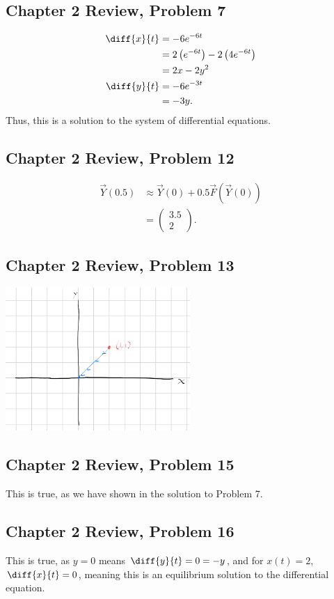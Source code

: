 \documentclass[10pt]{mypackage}
\begin{document}
\subsection{Chapter 2 Review, Problem 7}%
\begin{align*}
  \diff{x}{t} &= -6e^{-6t}\\
              &= 2\left(e^{-6t}\right) - 2\left(4e^{-6t}\right)\\
              &= 2x - 2y^2\\
  \diff{y}{t} &= -6e^{-3t}\\
              &= -3y.
\end{align*}
Thus, this is a solution to the system of differential equations.
\subsection{Chapter 2 Review, Problem 12}%
\begin{align*}
  \vec{Y}\left(0.5\right) &\approx \vec{Y}(0) + 0.5\vec{F}\left(\vec{Y}(0)\right)\\
                          &= \begin{pmatrix}3.5\\2\end{pmatrix}.
\end{align*}
\subsection{Chapter 2 Review, Problem 13}%
\begin{center}
  \includegraphics[width=7cm]{images/2_review_13.png}
\end{center}
\subsection{Chapter 2 Review, Problem 15}%
This is true, as we have shown in the solution to Problem 7.
\subsection{Chapter 2 Review, Problem 16}%
This is true, as $y = 0$ means $\diff{y}{t} = 0 = -y$, and for $x(t) = 2$, $\diff{x}{t} = 0$, meaning this is an equilibrium solution to the differential equation.
\end{document}
